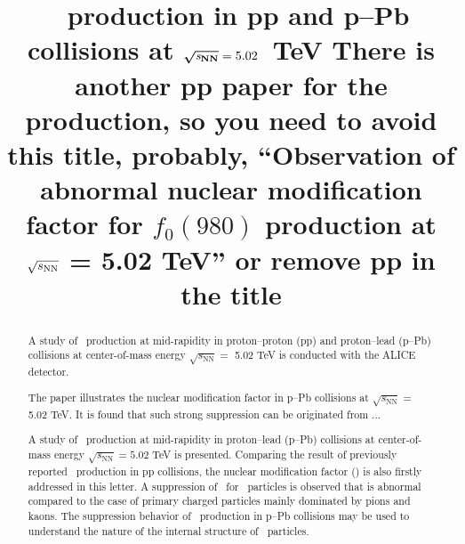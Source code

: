 \documentclass[ALICE,manyauthors]{cernphprep}
\begin{document}
\begin{titlepage}

\PHyear{}
\PHdate{\today}
%

\title{\fzero\ production in pp and p--Pb collisions at $\boldsymbol{\sqrt{{\textit s_\mathrm{NN}}}}=5.02$~TeV \color{red} There is another pp paper for the production, so you need to avoid this title, probably, ``Observation of abnormal nuclear modification factor for $f_0 (980)$ production at $\sqrt{s_{\rm NN}}$ = 5.02 TeV'' or remove pp in the title \color{black}}
\ShortTitle{}   %


\begin{abstract}
A study of \fzero~production at mid-rapidity in proton--proton (pp) and proton--lead (p--Pb) collisions at center-of-mass energy $\sqrt{s_{\mathrm{NN}}} = $ 5.02 TeV is conducted with the ALICE detector. 

The paper illustrates the nuclear modification factor in p--Pb collisions at $\sqrt{s_{\mathrm{NN}}}=$ 5.02 TeV. It is found that such strong suppression can be originated from ...

\color{red}
A study of \fzero~production at mid-rapidity in proton--lead (p--Pb) collisions at center-of-mass energy $\sqrt{s_{\mathrm{NN}}} = 5.02$ TeV is presented. Comparing the result of previously reported \fzero~production in pp collisions, the nuclear modification factor (\qppb) is also firstly addressed in this letter. A suppression of \qppb\ for \fzero\ particles is observed that is abnormal compared to the case of primary charged particles mainly dominated by pions and kaons. The suppression behavior of \fzero\ production in p--Pb collisions may be used to understand the nature of the internal structure of \fzero\ particles. 



\color{black}

\end{abstract}

\end{titlepage}

\setcounter{page}{2}
\end{document}
